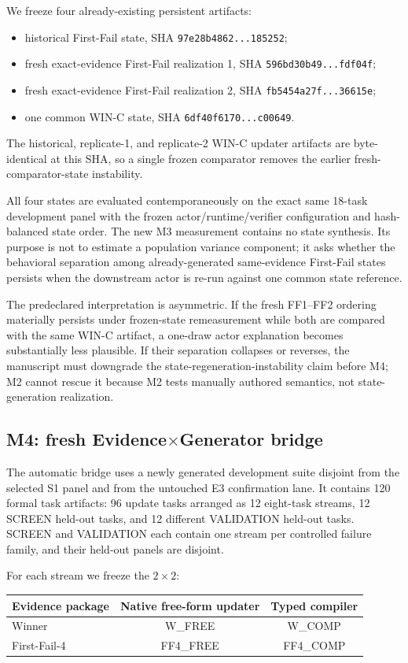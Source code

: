 We freeze four already-existing persistent artifacts:
\begin{itemize}
    \item historical First-Fail state, SHA \texttt{97e28b4862...185252};
    \item fresh exact-evidence First-Fail realization 1, SHA \texttt{596bd30b49...fdf04f};
    \item fresh exact-evidence First-Fail realization 2, SHA \texttt{fb5454a27f...36615e};
    \item one common WIN-C state, SHA \texttt{6df40f6170...c00649}.
\end{itemize}
The historical, replicate-1, and replicate-2 WIN-C updater artifacts are byte-identical at this SHA, so a single frozen comparator removes the earlier fresh-comparator-state instability.

All four states are evaluated contemporaneously on the exact same 18-task development panel with the frozen actor/runtime/verifier configuration and hash-balanced state order. The new M3 measurement contains no state synthesis. Its purpose is not to estimate a population variance component; it asks whether the behavioral separation among already-generated same-evidence First-Fail states persists when the downstream actor is re-run against one common state reference.

The predeclared interpretation is asymmetric. If the fresh FF1--FF2 ordering materially persists under frozen-state remeasurement while both are compared with the same WIN-C artifact, a one-draw actor explanation becomes substantially less plausible. If their separation collapses or reverses, the manuscript must downgrade the state-regeneration-instability claim before M4; M2 cannot rescue it because M2 tests manually authored semantics, not state-generation realization.

\subsection{M4: fresh Evidence$\times$Generator bridge}
The automatic bridge uses a newly generated development suite disjoint from the selected S1 panel and from the untouched E3 confirmation lane. It contains 120 formal task artifacts: 96 update tasks arranged as 12 eight-task streams, 12 SCREEN held-out tasks, and 12 different VALIDATION held-out tasks. SCREEN and VALIDATION each contain one stream per controlled failure family, and their held-out panels are disjoint.

For each stream we freeze the $2\times2$:
\begin{center}
\begin{tabular}{lcc}
\toprule
Evidence package & Native free-form updater & Typed compiler \\
\midrule
Winner & W\_FREE & W\_COMP \\
First-Fail-4 & FF4\_FREE & FF4\_COMP \\
\bottomrule
\end{tabular}
\end{center}

